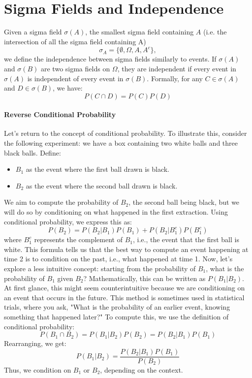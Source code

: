     \section{Sigma Fields and Independence}
    Given a sigma field \( \sigma(A) \), the smallest sigma field containing \( A \) (i.e. the intersection of all the sigma field containing A)
    \[
    \sigma_A = \{\emptyset, \Omega, A, A^c\},
    \]
    we define the independence between sigma fields similarly to events. If \( \sigma(A) \) and \( \sigma(B) \) are two sigma fields on $\Omega$, they are independent if every event in \( \sigma(A) \) is independent of every event in \( \sigma(B) \). Formally, for any \( C \in \sigma(A) \) and \( D \in \sigma(B) \), we have:
    \[
    P(C \cap D) = P(C)P(D)
    \]

    \paragraph{Reverse Conditional Probability}
    Let's return to the concept of conditional probability. To illustrate this, consider the following experiment: we have a box containing two white balls and three black balls. Define:
    \begin{itemize}
        \item \( B_1 \) as the event where the first ball drawn is black.
        \item \( B_2 \) as the event where the second ball drawn is black.
    \end{itemize}
    We aim to compute the probability of \( B_2 \), the second ball being black, but we will do so by conditioning on what happened in the first extraction. Using conditional probability, we express this as:
    \[
    P(B_2) = P(B_2 | B_1) P(B_1) + P(B_2 | B_1^c) P(B_1^c)
    \]
    where \( B_1^c \) represents the complement of \( B_1 \), i.e., the event that the first ball is white. This formula tells us that the best way to compute an event happening at time 2 is to condition on the past, i.e., what happened at time 1.\newline
    Now, let's explore a less intuitive concept: starting from the probability of \( B_1 \), what is the probability of \( B_1 \) given \( B_2 \)? Mathematically, this can be written as \( P(B_1 | B_2) \). \newline
    At first glance, this might seem counterintuitive because we are conditioning on an event that occurs in the future. This method is sometimes used in statistical trials, where you ask, "What is the probability of an earlier event, knowing something that happened later?"  \newline
    To compute this, we use the definition of conditional probability:
    \[
    P(B_1 \cap B_2) = P(B_1 | B_2) P(B_2) = P(B_2 | B_1) P(B_1)
    \]
    Rearranging, we get:
    \[
    P(B_1 | B_2) = \frac{P(B_2 | B_1) P(B_1)}{P(B_2)}
    \]
    Thus, we condition on \( B_1 \) or \( B_2 \), depending on the context. 
    
